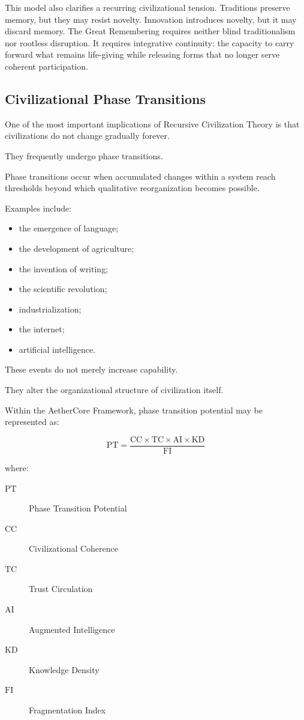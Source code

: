 \documentclass[12pt]{article}
\begin{document}
This model also clarifies a recurring civilizational tension. Traditions preserve memory, but they may resist novelty. Innovation introduces novelty, but it may discard memory. The Great Remembering requires neither blind traditionalism nor rootless disruption. It requires integrative continuity: the capacity to carry forward what remains life-giving while releasing forms that no longer serve coherent participation.

\subsection{Civilizational Phase Transitions}

One of the most important implications of Recursive Civilization Theory is that civilizations do not change gradually forever.

They frequently undergo phase transitions.

Phase transitions occur when accumulated changes within a system reach thresholds beyond which qualitative reorganization becomes possible.

Examples include:

\begin{itemize}
  \item the emergence of language;
  \item the development of agriculture;
  \item the invention of writing;
  \item the scientific revolution;
  \item industrialization;
  \item the internet;
  \item artificial intelligence.
\end{itemize}

These events do not merely increase capability.

They alter the organizational structure of civilization itself.

Within the AetherCore Framework, phase transition potential may be represented as:

\[
\mathrm{PT}=\frac{\mathrm{CC}\times \mathrm{TC}\times \mathrm{AI}\times \mathrm{KD}}{\mathrm{FI}}
\]

where:

\begin{description}
  \item[\(\mathrm{PT}\)] Phase Transition Potential
  \item[\(\mathrm{CC}\)] Civilizational Coherence
  \item[\(\mathrm{TC}\)] Trust Circulation
  \item[\(\mathrm{AI}\)] Augmented Intelligence
  \item[\(\mathrm{KD}\)] Knowledge Density
  \item[\(\mathrm{FI}\)] Fragmentation Index
\end{description}
\end{document}
